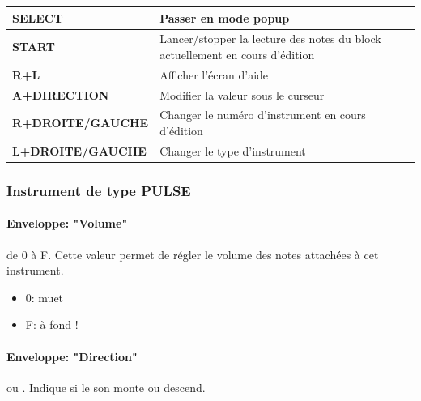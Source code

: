 \documentclass[12pt,a4paper]{article}
\begin{document}
        \tablelasttail{\hline}
        \begin{supertabular}{|l|p{11cm}|}
        \hline
            {\bf SELECT} & Passer en mode popup \\
            \hline
            {\bf START} & Lancer/stopper la lecture des notes du block actuellement en cours d'édition \\
            \hline
            {\bf R+L} & Afficher l'écran d'aide \\
            \hline
            {\bf A+DIRECTION} & Modifier la valeur sous le curseur \\
            \hline
            {\bf R+DROITE/GAUCHE} & Changer le numéro d'instrument en cours d'édition \\
            \hline
            {\bf L+DROITE/GAUCHE} & Changer le type d'instrument \\
        \hline
        \end{supertabular}
    
        \subsubsection{Instrument de type PULSE}
        
        
            \paragraph{Enveloppe: "Volume"} de 0 à F. Cette valeur permet de régler le volume des notes attachées à cet instrument. 
            \begin{itemize}
                \item{0: muet}
                \item{F: à fond !}
            \end{itemize}
            
            \paragraph{Enveloppe: "Direction"}  ou .
            Indique si le son monte ou descend.
            
\end{document}
